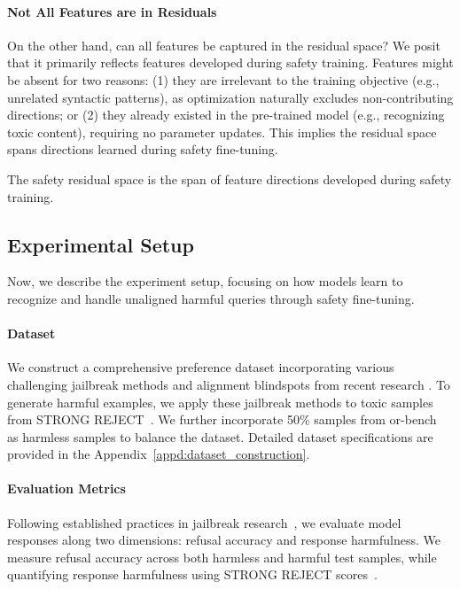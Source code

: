 \paragraph{Not All Features are in Residuals}

On the other hand, can all features be captured in the residual space? We posit that it primarily reflects features developed during safety training. Features might be absent for two reasons: (1) they are irrelevant to the training objective (e.g., unrelated syntactic patterns), as optimization naturally excludes non-contributing directions; or (2) they already existed in the pre-trained model (e.g., recognizing toxic content), requiring no parameter updates. This implies the residual space spans directions learned during safety fine-tuning.

\begin{corollary}
    The safety residual space is the span of feature directions developed during safety training.
\end{corollary}

\subsection{Experimental Setup}
Now, we describe the experiment setup, focusing on how models learn to recognize and handle unaligned harmful queries through safety fine-tuning.

\paragraph{Dataset} 
We construct a comprehensive preference dataset incorporating various challenging jailbreak methods and alignment blindspots from recent research \cite{ding2023wolf,yu2023gptfuzzer,zou2023universal,chao2023pair,liu2024flipattack}. To generate harmful examples, we apply these jailbreak methods to toxic samples from STRONG REJECT~\cite{souly2024strongreject}. We further incorporate 50\% samples from or-bench~\cite{cui2024or} as harmless samples to balance the dataset. Detailed dataset specifications are provided in the Appendix~\ref{appd:dataset_construction}.

\paragraph{Evaluation Metrics}
Following established practices in jailbreak research~\cite{zou2023universal,souly2024strongreject}, we evaluate model responses along two dimensions: refusal accuracy and response harmfulness. We measure refusal accuracy across both harmless and harmful test samples, while quantifying response harmfulness using STRONG REJECT scores~\cite{souly2024strongreject}.


